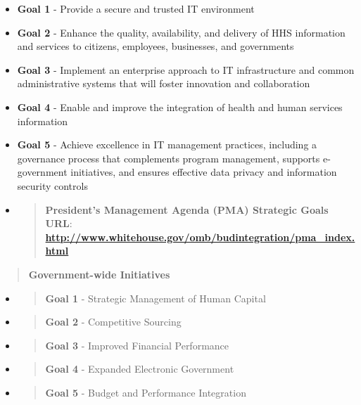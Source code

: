 \begin{itemize}
\item
  \textbf{Goal 1} - Provide a secure and trusted IT environment
\item
  \textbf{Goal 2} - Enhance the quality, availability, and delivery of
  HHS information and services to citizens, employees, businesses, and
  governments
\item
  \textbf{Goal 3} - Implement an enterprise approach to IT
  infrastructure and common administrative systems that will foster
  innovation and collaboration
\item
  \textbf{Goal 4} - Enable and improve the integration of health and
  human services information
\item
  \textbf{Goal 5} - Achieve excellence in IT management practices,
  including a governance process that complements program management,
  supports e-government initiatives, and ensures effective data privacy
  and information security controls
\end{itemize}

\begin{itemize}
\item
  \begin{quote}
  \textbf{President's Management Agenda (PMA) Strategic Goals}\\
  \textbf{URL}:
  \href{http://www.whitehouse.gov/omb/budintegration/pma_index.html}{\textbf{http://www.whitehouse.gov/omb/budintegration/pma\_index.html}}
  \end{quote}
\end{itemize}

\begin{quote}
\textbf{Government-wide Initiatives}
\end{quote}

\begin{itemize}
\item
  \begin{quote}
  \textbf{Goal 1} - Strategic Management of Human Capital
  \end{quote}
\item
  \begin{quote}
  \textbf{Goal 2} - Competitive Sourcing
  \end{quote}
\item
  \begin{quote}
  \textbf{Goal 3} - Improved Financial Performance
  \end{quote}
\item
  \begin{quote}
  \textbf{Goal 4} - Expanded Electronic Government
  \end{quote}
\item
  \begin{quote}
  \textbf{Goal 5} - Budget and Performance Integration
  \end{quote}
\end{itemize}


